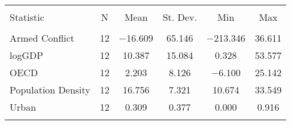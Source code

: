 \begin{table}[!htbp] \centering 
  \caption{} 
  \label{} 
\begin{tabular}{@{\extracolsep{5pt}}lccccc} 
\\[-1.8ex]\hline 
\hline \\[-1.8ex] 
Statistic & \multicolumn{1}{c}{N} & \multicolumn{1}{c}{Mean} & \multicolumn{1}{c}{St. Dev.} & \multicolumn{1}{c}{Min} & \multicolumn{1}{c}{Max} \\ 
\hline \\[-1.8ex] 
Armed Conflict & 12 & $-$16.609 & 65.146 & $-$213.346 & 36.611 \\ 
logGDP & 12 & 10.387 & 15.084 & 0.328 & 53.577 \\ 
OECD & 12 & 2.203 & 8.126 & $-$6.100 & 25.142 \\ 
Population Density & 12 & 16.756 & 7.321 & 10.674 & 33.549 \\ 
Urban & 12 & 0.309 & 0.377 & 0.000 & 0.916 \\ 
\hline \\[-1.8ex] 
\end{tabular} 
\end{table} 
